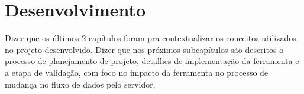 \chapter{Desenvolvimento}

Dizer que os últimos 2 capítulos foram pra contextualizar os conceitos utilizados no projeto desenvolvido. Dizer que nos próximos subcapítulos são descritos o processo de planejamento de projeto, detalhes de implementação da ferramenta e a etapa de validação, com foco no impacto da ferramenta no processo de mudança no fluxo de dados pelo servidor.




